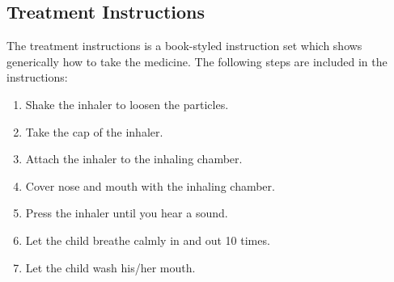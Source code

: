 \subsection{Treatment Instructions}
\label{sec:description-instructions}
The treatment instructions is a book-styled instruction set which shows generically how to take the medicine. 
The following steps are included in the instructions: 
\begin{enumerate}
  \item Shake the inhaler to loosen the particles. 
  \item Take the cap of the inhaler.
  \item Attach the inhaler to the inhaling chamber.
  \item Cover nose and mouth with the inhaling chamber.
  \item Press the inhaler until you hear a sound.
  \item Let the child breathe calmly in and out 10 times.
  \item Let the child wash his/her mouth.
\end{enumerate} 

